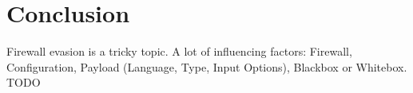 \section{Conclusion}
Firewall evasion is a tricky topic. A lot of influencing factors: Firewall, Configuration, Payload (Language, Type, Input Options), Blackbox or Whitebox. {\color{red}TODO}
